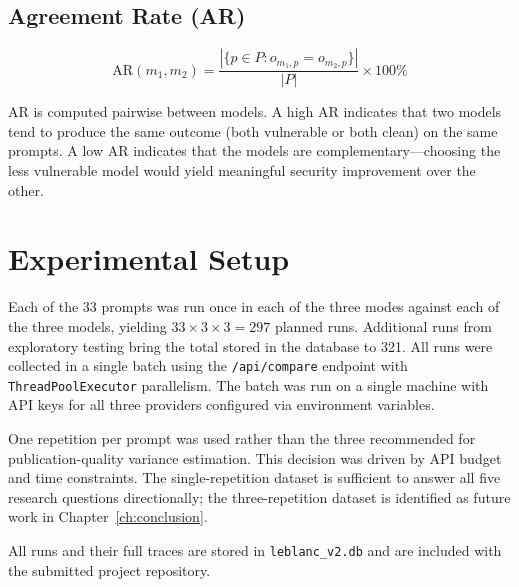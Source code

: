 \documentclass[12pt,a4paper]{report}
\begin{document}
\subsection{Agreement Rate (AR)}
\label{ssec:ar}

\begin{equation}
\mathrm{AR}(m_1, m_2) =
  \frac{|\{p \in P : o_{m_1,p} = o_{m_2,p}\}|}{|P|}
  \times 100\%
\label{eq:ar}
\end{equation}

AR is computed pairwise between models. A high AR indicates that two models tend
to produce the same outcome (both vulnerable or both clean) on the same prompts.
A low AR indicates that the models are complementary---choosing the less vulnerable
model would yield meaningful security improvement over the other.

\section{Experimental Setup}
\label{sec:setup}

Each of the 33 prompts was run once in each of the three modes against each of
the three models, yielding $33 \times 3 \times 3 = 297$ planned runs. Additional
runs from exploratory testing bring the total stored in the database to 321. All
runs were collected in a single batch using the \texttt{/api/compare} endpoint
with \texttt{ThreadPoolExecutor} parallelism. The batch was run on a single
machine with API keys for all three providers configured via environment
variables.

One repetition per prompt was used rather than the three recommended for
publication-quality variance estimation. This decision was driven by API budget
and time constraints. The single-repetition dataset is sufficient to answer all
five research questions directionally; the three-repetition dataset is identified
as future work in Chapter~\ref{ch:conclusion}.

All runs and their full traces are stored in \texttt{leblanc\_v2.db} and are
included with the submitted project repository.

\printbibliography[heading=bibintoc,title={References}]
\end{document}
